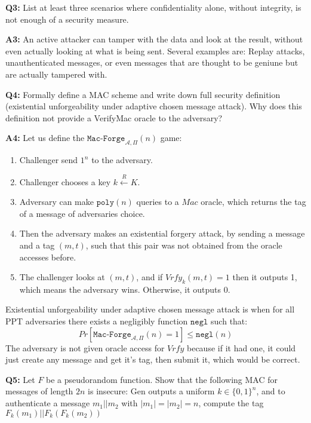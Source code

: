 \documentclass[12pt,reqno]{amsart}
\newcommand{\code}[1]{\texttt{#1}}
\newcommand{\advrs}[0]{\mathcal{A}}
\begin{document}
\vspace{20px}
\textbf{Q3:} List at least three scenarios where confidentiality alone, without integrity, is not enough of a security measure.

\textbf{A3:} An active attacker can tamper with the data and look at the result, without even actually looking at what is being sent. Several examples are: Replay attacks, unauthenticated messages, or even messages that are thought to be geniune but are actually tampered with.

\vspace{20px}
\textbf{Q4:} Formally define a MAC scheme and write down full security definition (existential unforgeability under adaptive chosen message attack). Why does this definition not provide a VerifyMac oracle to the adversary?

\textbf{A4:} Let us define the $\code{Mac-Forge}_{\advrs, \Pi}(n)$ game:
\begin{enumerate}
	\item Challenger send $1^n$ to the adversary.
	\item Challenger chooses a key $k \xleftarrow{R} K$.
	\item Adversary can make $\code{poly}(n)$ queries to a $Mac$ oracle, which returns the tag of a message of adversaries choice.
	\item Then the adversary makes an existential forgery attack, by sending a message and a tag $(m, t)$, such that this pair was not obtained from the oracle accesses before.
	\item The challenger looks at $(m, t)$, and if $Vrfy_k(m,t)=1$ then it outputs 1, which means the adversary wins. Otherwise, it outputs 0.
\end{enumerate}
Existential unforgeability under adaptive chosen message attack is when for all PPT adversaries there exists a negligibly function $\code{negl}$ such that:
$$
Pr[\code{Mac-Forge}_{\advrs, \Pi}(n) = 1] \leq \code{negl}(n)
$$
The adversary is not given oracle access for $Vrfy$ because if it had one, it could just create any message and get it's tag, then submit it, which would be correct.

\vspace{20px}
\textbf{Q5:} Let $F$ be a pseudorandom function. Show that the following MAC for messages of length $2n$ is insecure: Gen outputs a uniform $k \in \{0, 1\}^n$, and to authenticate a message $m_1 || m_2$ with $|m_1|=|m_2|=n$, compute the tag $F_k(m_1) || F_k(F_k(m_2))$
\end{document}
